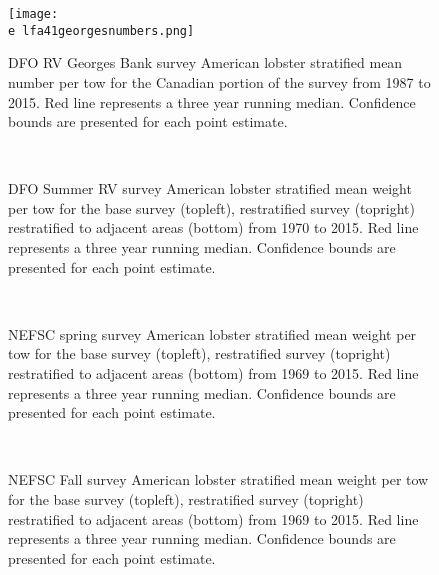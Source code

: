 \documentclass[11pt]{article}
\newcommand{\e}{/backup/bio_data/bio.lobster/figures/} %
\begin{document}
\begin{figure}

    \texttt{[image: \\e lfa41georgesnumbers.png]}
    \caption{DFO RV Georges Bank survey American lobster stratified mean number per tow for the Canadian portion of the survey from 1987 to 2015. Red line represents a three year running median. Confidence bounds are presented for each point estimate.}

\end{figure}


\begin{figure}
\centering
{}
\\
\caption{DFO Summer RV survey American lobster stratified mean weight per tow for the base survey (topleft), restratified survey (topright) restratified to adjacent areas (bottom) from 1970 to 2015. Red line represents a three year running median. Confidence bounds are presented for each point estimate.}
\end{figure}
\clearpage



\begin{figure}
\centering
{}
\\
\caption{NEFSC spring survey American lobster stratified mean weight per tow for the base survey (topleft), restratified survey (topright) restratified to adjacent areas (bottom) from 1969 to 2015. Red line represents a three year running median. Confidence bounds are presented for each point estimate. }
\end{figure}
\clearpage



\begin{figure}
\centering
{}
\\
\caption{NEFSC Fall survey American lobster stratified mean weight per tow for the base survey (topleft), restratified survey (topright) restratified to adjacent areas (bottom) from 1969 to 2015. Red line represents a three year running median. Confidence bounds are presented for each point estimate. }
\end{figure}
\clearpage
\end{document}
